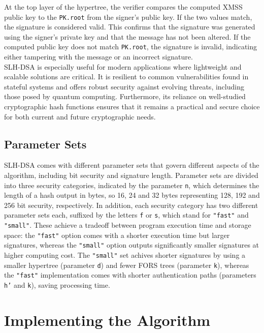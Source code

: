 \documentclass[journal=tosc,notanonymous]{iacrtrans}
\begin{document}
At the top layer of the hypertree, the verifier compares the computed XMSS public key to the \texttt{PK.root} from the signer's public key. If the two values match, the signature is considered valid. This confirms that the signature was generated using the signer's private key and that the message has not been altered. If the computed public key does not match \texttt{PK.root}, the signature is invalid, indicating either tampering with the message or an incorrect signature. \cite{national-institute-of-standards-and-technology-2024}\\
\newline
SLH-DSA is especially useful for modern applications where lightweight and scalable solutions are critical. It is resilient to common vulnerabilities found in stateful systems and offers robust security against evolving threats, including those posed by quantum computing. Furthermore, its reliance on well-studied cryptographic hash functions ensures that it remains a practical and secure choice for both current and future cryptographic needs.

\subsection{Parameter Sets}

SLH-DSA comes with different parameter sets that govern different aspects of the algorithm, including bit security and signature length.
Parameter sets are divided into three security categories, indicated by the parameter \texttt{n}, which determines the length of a hash output in bytes, so 16, 24 and 32 bytes representing 128, 192 and 256 bit security, respectively.
In addition, each security category has two different parameter sets each, suffixed by the letters \texttt{f} or \texttt{s}, which stand for \texttt{"fast"} and \texttt{"small"}.
These achieve a tradeoff between program execution time and storage space: the \texttt{"fast"} option comes with a shorter execution time but larger signatures, whereas the \texttt{"small"} option outputs significantly smaller signatures at higher computing cost.
The \texttt{"small"} set achives shorter signatures by using a smaller hypertree (parameter \texttt{d}) and fewer FORS trees (parameter \texttt{k}), whereas the \texttt{"fast"} implementation comes with shorter authentication paths (parameters \texttt{h'} and \texttt{k}), saving processing time.


\section{Implementing the Algorithm}
\end{document}

